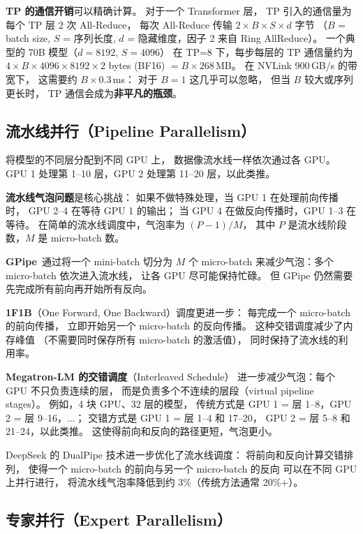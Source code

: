 \textbf{TP 的通信开销}可以精确计算。
对于一个 Transformer 层，
TP 引入的通信量为每个 TP 层 2 次 All-Reduce，
每次 All-Reduce 传输 $2 \times B \times S \times d$ 字节
（$B$ = batch size, $S$ = 序列长度, $d$ = 隐藏维度，因子 2 来自 Ring AllReduce）。
一个典型的 70B 模型（$d = 8192$, $S = 4096$）
在 TP=8 下，每步每层的 TP 通信量约为
$4 \times B \times 4096 \times 8192 \times 2$ bytes (BF16)
$= B \times 268$\,MB。
在 NVLink 900\,GB/s 的带宽下，
这需要约 $B \times 0.3$\,ms：
对于 $B = 1$ 这几乎可以忽略，
但当 $B$ 较大或序列更长时，
TP 通信会成为\textbf{非平凡的瓶颈}。

\subsection{流水线并行（Pipeline Parallelism）}

将模型的不同层分配到不同 GPU 上，
数据像流水线一样依次通过各 GPU。
GPU 1 处理第 1--10 层，GPU 2 处理第 11--20 层，以此类推。

\textbf{流水线气泡问题}是核心挑战：
如果不做特殊处理，当 GPU 1 在处理前向传播时，
GPU 2--4 在等待 GPU 1 的输出；
当 GPU 4 在做反向传播时，GPU 1--3 在等待。
在简单的流水线调度中，气泡率为 $(P-1)/M$，
其中 $P$ 是流水线阶段数，$M$ 是 micro-batch 数。

\textbf{GPipe}~通过将一个 mini-batch 切分为 $M$ 个 micro-batch
来减少气泡：多个 micro-batch 依次进入流水线，
让各 GPU 尽可能保持忙碌。
但 GPipe 仍然需要先完成所有前向再开始所有反向。%

\textbf{1F1B}（One Forward, One Backward）调度更进一步：
每完成一个 micro-batch 的前向传播，
立即开始另一个 micro-batch 的反向传播。
这种交错调度减少了内存峰值
（不需要同时保存所有 micro-batch 的激活值），
同时保持了流水线的利用率。

\textbf{Megatron-LM 的交错调度}（Interleaved Schedule）
进一步减少气泡：每个 GPU 不只负责连续的层，
而是负责多个不连续的层段（virtual pipeline stages）。
例如，4 块 GPU、32 层的模型，
传统方式是 GPU 1 = 层 1--8，GPU 2 = 层 9--16，...；
交错方式是 GPU 1 = 层 1--4 和 17--20，
GPU 2 = 层 5--8 和 21--24，以此类推。
这使得前向和反向的路径更短，气泡更小。

DeepSeek 的 DualPipe 技术进一步优化了流水线调度：
将前向和反向计算交错排列，
使得一个 micro-batch 的前向与另一个 micro-batch 的反向
可以在不同 GPU 上并行进行，
将流水线气泡率降低到约 3\%（传统方法通常 20\%+）。

\subsection{专家并行（Expert Parallelism）}

